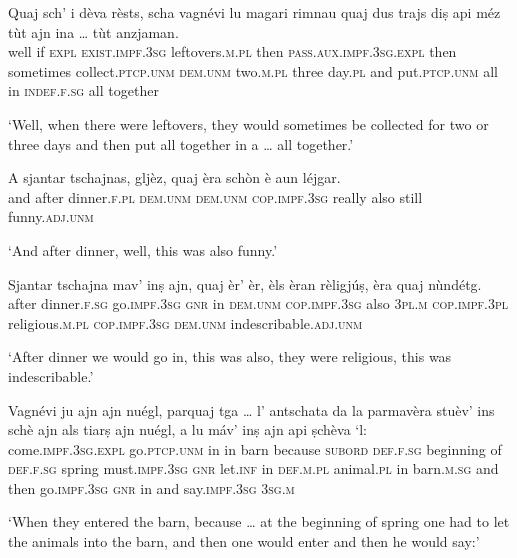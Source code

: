 \begin{linenumbers}
\gll  Quaj sch’ i dèva rèsts, scha vagnévi lu magari rimnau quaj dus trajs diṣ api méz tùt ajn ina … tùt anzjaman.  \\
well if \textsc{expl} \textsc{exist.impf.3sg} leftovers.\textsc{m.pl} then \textsc{pass.aux.impf.3sg.expl} then sometimes collect.\textsc{ptcp.unm} \textsc{dem.unm} two.\textsc{m.pl} three day.\textsc{pl} and put.\textsc{ptcp.unm} all in  \textsc{indef.f.sg} {} all together\\
\end{linenumbers} 
\medskip
\glt `Well, when there were leftovers, they would sometimes be collected for two or three days and then put all together in a … all together.'
\medskip

\begin{linenumbers}
\gll A sjantar tschajnas, gljèz, quaj èra schòn è aun léjgar.   \\
and after dinner.\textsc{f.pl} \textsc{dem.unm} \textsc{dem.unm} \textsc{cop.impf.3sg} really also still funny.\textsc{adj.unm}  \\
\end{linenumbers}
\medskip
\glt `And after dinner, well, this was also funny.'
\medskip

\begin{linenumbers}
\gll  Sjantar tschajna mav’ inṣ ajn, quaj èr’ èr, èls èran rèligjúṣ, èra quaj nùndétg. \\
after dinner.\textsc{f.sg} go.\textsc{impf.3sg} \textsc{gnr} in \textsc{dem.unm} \textsc{cop.impf.3sg} also \textsc{3pl.m} \textsc{cop.impf.3pl} religious.\textsc{m.pl} \textsc{cop.impf.3sg} \textsc{dem.unm} indescribable.\textsc{adj.unm}\\
\end{linenumbers}
\medskip
\glt `After dinner we would go in, this was also, they were religious, this was indescribable.'
\medskip

\begin{linenumbers}
\gll  Vagnévi ju ajn ajn nuégl, parquaj tga … l’ antschata da la parmavèra stuèv’ ins schè ajn als tiarṣ ajn nuégl, a lu máv’ inṣ ajn api ṣchèva `l:   \\
 come.\textsc{impf.3sg.expl} go.\textsc{ptcp.unm} in in barn because \textsc{subord} {} \textsc{def.f.sg} beginning of \textsc{def.f.sg} spring must.\textsc{impf.3sg} \textsc{gnr} let.\textsc{inf} in \textsc{def.m.pl} animal.\textsc{pl} in barn.\textsc{m.sg} and then go.\textsc{impf.3sg} \textsc{gnr} in and say.\textsc{impf.3sg} \textsc{3sg.m}\\
\end{linenumbers}
\medskip
\glt `When they entered the barn, because … at the beginning of spring one had to let the animals into the barn, and then one would enter and then he would say:'
\medskip

